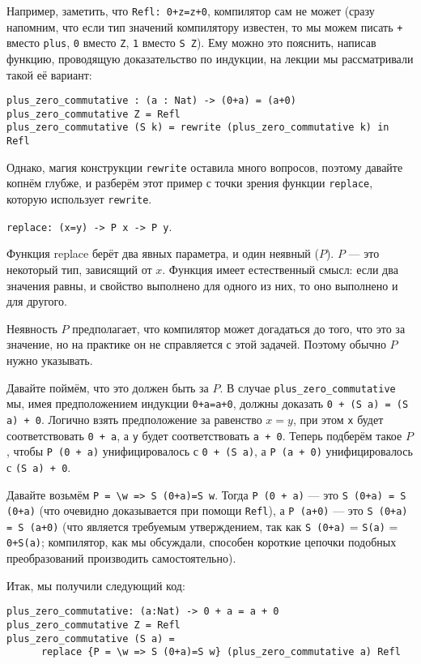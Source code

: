 \documentclass[10pt,a4paper,oneside]{article}
\begin{document}
Например, заметить, что \verb!Refl: 0+z=z+0!, компилятор сам не может
(сразу напомним, что если тип значений компилятору известен, то мы можем
писать \verb!+! вместо \verb!plus!, \verb!0! вместо \verb!Z!,
\verb!1! вместо \verb!S Z!).
Ему можно это пояснить, написав функцию, проводящую доказательство
по индукции, на лекции мы рассматривали такой её вариант:

\begin{verbatim}
plus_zero_commutative : (a : Nat) -> (0+a) = (a+0)
plus_zero_commutative Z = Refl
plus_zero_commutative (S k) = rewrite (plus_zero_commutative k) in Refl
\end{verbatim}

Однако, магия конструкции \verb!rewrite! оставила много вопросов,
поэтому давайте копнём глубже, и разберём этот пример с точки зрения 
функции \verb!replace!, которую использует \verb!rewrite!.

\verb!replace: (x=y) -> P x -> P y!.

Функция replace берёт два явных параметра, и один неявный ($P$).
$P$ --- это некоторый тип, зависящий от $x$. Функция имеет естественный 
смысл: если два значения равны, и свойство выполнено для одного из них, 
то оно выполнено и для другого.

Неявность $P$ предполагает, что компилятор может догадаться до того, что
это за значение, но на практике он не справляется с этой задачей. 
Поэтому обычно $P$ нужно указывать.

Давайте поймём, что это должен быть за $P$. В случае \verb!plus_zero_commutative!
мы, имея предположением индукции \verb!0+a=a+0!, должны
доказать \verb!0 + (S a) = (S a) + 0!. Логично взять предположение
за равенство $x=y$, при этом \verb!x! будет соответствовать \verb!0 + a!,
а \verb!y! будет соответствовать \verb!a + 0!.
Теперь подберём такое $P$, чтобы \verb!P (0 + a)! 
унифицировалось с \verb!0 + (S a)!, а \verb!P (a + 0)! унифицировалось 
с \verb!(S a) + 0!.

Давайте возьмём \verb!P = \w => S (0+a)=S w!. Тогда \verb!P (0 + a)! --- это
\verb!S (0+a) = S (0+a)! (что очевидно доказывается при помощи \verb!Refl!), 
а \verb!P (a+0)! --- это \verb!S (0+a) = S (a+0)! (что является требуемым 
утверждением, так как \verb!S (0+a)! = \verb!S(a)! = \verb!0+S(a)!; компилятор,
как мы обсуждали, способен короткие цепочки подобных преобразований
производить самостоятельно).

Итак, мы получили следующий код:
\begin{verbatim}
plus_zero_commutative: (a:Nat) -> 0 + a = a + 0
plus_zero_commutative Z = Refl
plus_zero_commutative (S a) = 
      replace {P = \w => S (0+a)=S w} (plus_zero_commutative a) Refl
\end{verbatim}
\end{document}

